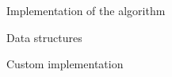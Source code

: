 \documentclass[9pt]{extarticle}
\begin{document}
\begin{section}{Implementation of the algorithm}
\begin{subsection}{Data structures}
            
        \end{subsection}
        
        \begin{subsection}{Custom implementation}



\end{subsection}
\end{section}
\end{document}
